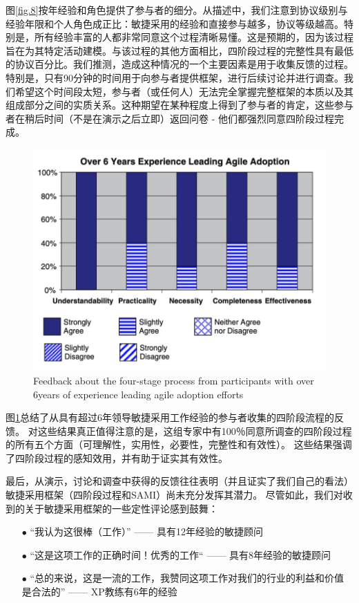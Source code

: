 \documentclass[twocolumn]{svjour3}[]
\begin{document}
图\ref{fig.8}按年经验和角色提供了参与者的细分。从描述中，我们注意到协议级别与经验年限和个人角色成正比：敏捷采用的经验和直接参与越多，协议等级越高。特别是，所有经验丰富的人都非常同意这个过程清晰易懂。这是预期的，因为该过程旨在为其特定活动建模。与该过程的其他方面相比，四阶段过程的完整性具有最低的协议百分比。我们推测，造成这种情况的一个主要因素是用于收集反馈的过程。特别是，只有90分钟的时间用于向参与者提供框架，进行后续讨论并进行调查。我们希望这个时间段太短，参与者（或任何人）无法完全掌握完整框架的本质以及其组成部分之间的实质关系。这种期望在某种程度上得到了参与者的肯定，这些参与者在稍后时间（不是在演示之后立即）返回问卷 - 他们都强烈同意四阶段过程完成。

\begin{figure} [htb]
    \centering
    \includegraphics[width=1.0\linewidth]{img/fig9.jpg}
    \caption{Feedback about the four-stage process from participants with over 6years of experience leading agile adoption efforts}
    \label{fig.9}
\end{figure}

图\ref{fig.9}总结了从具有超过6年领导敏捷采用工作经验的参与者收集的四阶段流程的反馈。 对这些结果真正值得注意的是，这组专家中有100％同意所调查的四阶段过程的所有五个方面（可理解性，实用性，必要性，完整性和有效性）。 这些结果强调了四阶段过程的感知效用，并有助于证实其有效性。

最后，从演示，讨论和调查中获得的反馈往往表明（并且证实了我们自己的看法）敏捷采用框架（四阶段过程和SAMI）尚未充分发挥其潜力。 尽管如此，我们对收到的关于敏捷采用框架的一些定性评论感到鼓舞：

\begin{itemize}
    \item[$\bullet$] “我认为这很棒（工作）” —— 具有12年经验的敏捷顾问
    \item[$\bullet$] “这是这项工作的正确时间！优秀的工作“ —— 具有8年经验的敏捷顾问
    \item[$\bullet$] “总的来说，这是一流的工作，我赞同这项工作对我们的行业的利益和价值是合法的” —— XP教练有6年的经验
\end{itemize}
\end{document}
